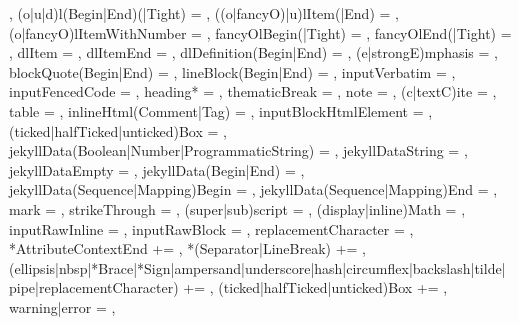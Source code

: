 {{    },
  (o|u|d)l(Begin|End)(|Tight) = {%
    },
  ((o|fancyO)|u)lItem(|End) = {%
    },
  (o|fancyO)lItemWithNumber = {%
    },
  fancyOlBegin(|Tight) = {%
    },
  fancyOlEnd(|Tight) = {%
    },
  dlItem = {%
    },
  dlItemEnd = {%
    },
  dlDefinition(Begin|End) = {%
    },
  (e|strongE)mphasis = {%
    },
  blockQuote(Begin|End) = {%
    },
  lineBlock(Begin|End) = {%
    },
  inputVerbatim = {%
    },
  inputFencedCode = {%
    },
  heading* = {%
    },
  thematicBreak = {%
    },
  note = {%
    },
  (c|textC)ite = {%
    },
  table = {%
    },
  inlineHtml(Comment|Tag) = {%
    },
  inputBlockHtmlElement = {%
    },
  (ticked|halfTicked|unticked)Box = {%
    },
  jekyllData(Boolean|Number|ProgrammaticString) = {%
    },
  jekyllDataString = {%
    },
  jekyllDataEmpty = {%
    },%
  jekyllData(Begin|End) = {%
    },
  jekyllData(Sequence|Mapping)Begin = {%
    },
  jekyllData(Sequence|Mapping)End = {%
    },
  mark = {%
    },
  strikeThrough = {%
    },
  (super|sub)script = {%
    },
  (display|inline)Math = {%
    },
  inputRawInline = {%
    },
  inputRawBlock = {%
    },
  replacementCharacter = {%
    },
  *AttributeContextEnd += {\GOBBLE},
  *(Separator|LineBreak) += {\GOBBLE},
  (ellipsis|nbsp|*Brace|*Sign|ampersand|underscore|hash|circumflex|backslash|tilde|pipe|replacementCharacter) += {\GOBBLE},
  (ticked|halfTicked|unticked)Box += {\GOBBLE},
  warning|error = {%
    },
}%
